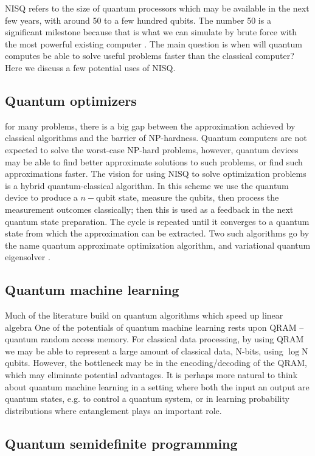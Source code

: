 NISQ refers to the size of quantum processors which may be available in the next few years, with around 50 to a few hundred qubits. The number 50 is a significant milestone because that is what we can simulate by brute force with the most powerful existing computer \cite{}. The main question is when will quantum computes be able to solve useful problems faster than the classical computer?
Here we discuss a few potential uses of NISQ.


\subsection{Quantum optimizers}
for many problems, there is a big gap between the approximation achieved by classical algorithms and the barrier of NP-hardness. Quantum computers are not expected to solve the worst-case NP-hard problems, however, quantum devices may be able to find better approximate solutions to such problems, or find such approximations faster. The vision for using NISQ to solve optimization problems is a hybrid quantum-classical algorithm. In this scheme we use the quantum device to produce a $n-$qubit state, measure the qubits, then process the measurement outcomes classically; then this is used as a feedback in the next quantum state preparation. The cycle is repeated until it converges to a quantum state from which the approximation can be extracted. Two such algorithms go by the name quantum approximate optimization algorithm\cite{}, and variational quantum eigensolver \cite{}.


\subsection{
Quantum machine learning}
Much of the literature build on quantum algorithms which speed up linear algebra
One of the potentials of quantum machine learning rests upon QRAM -- quantum random access memory. For classical data processing, by using QRAM we may be able to represent a large amount of classical data, N-bits, using $\log$N qubits. However, the bottleneck may be in the encoding/decoding of the QRAM, which may eliminate potential advantages. 
It is perhaps more natural to think about quantum machine learning in a setting where both the input an output are quantum states, e.g. to control a quantum system, or in learning probability distributions where entanglement plays an important role.

\subsection{Quantum semidefinite programming}

